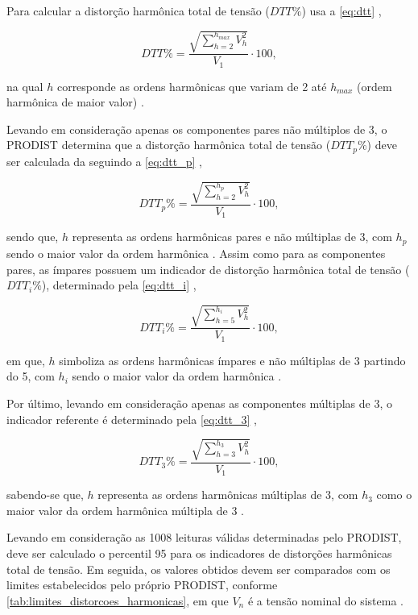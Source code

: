 Para calcular a distorção harmônica total de tensão ($DTT\%$) usa a \autoref{eq:dtt} \cite{ref:ANEEL2021},

\begin{equation}
  DTT\% = \frac{\sqrt{\sum_{h=2}^{h_{max}}V_h^2}}{V_1}\cdot 100,
  \label{eq:dtt}
\end{equation}

\noindent
na qual $h$ corresponde as ordens harmônicas que variam de 2 até $h_{max}$ (ordem harmônica de maior valor) \cite{ref:ANEEL2021}.

Levando em consideração apenas os componentes pares não múltiplos de 3, o PRODIST determina que a distorção harmônica total de tensão ($DTT_p\%$) deve ser calculada da seguindo a \autoref{eq:dtt_p} \cite{ref:ANEEL2021},

\begin{equation}
  DTT_p\% = \frac{\sqrt{\sum_{h=2}^{h_{p}}V_h^2}}{V_1}\cdot 100,
  \label{eq:dtt_p}
\end{equation}

\noindent
sendo que, $h$ representa as ordens harmônicas pares e não múltiplas de 3, com $h_p$ sendo o maior valor da ordem harmônica \cite{ref:ANEEL2021}. Assim como para as componentes pares, as ímpares possuem um indicador de distorção harmônica total de tensão ($DTT_i\%$), determinado pela \autoref{eq:dtt_i} \cite{ref:ANEEL2021},

\begin{equation}
  DTT_i\% = \frac{\sqrt{\sum_{h=5}^{h_{i}}V_h^2}}{V_1}\cdot 100,
  \label{eq:dtt_i}
\end{equation}

\noindent
em que, $h$ simboliza as ordens harmônicas ímpares e não múltiplas de 3 partindo do 5, com $h_i$ sendo o maior valor da ordem harmônica \cite{ref:ANEEL2021}.

Por último, levando em consideração apenas as componentes múltiplas de 3, o indicador referente é determinado pela \autoref{eq:dtt_3} \cite{ref:ANEEL2021},

\begin{equation}
  DTT_3\% = \frac{\sqrt{\sum_{h=3}^{h_{3}}V_h^2}}{V_1}\cdot 100,
  \label{eq:dtt_3}
\end{equation}

\noindent
sabendo-se que, $h$ representa as ordens harmônicas múltiplas de 3, com $h_3$ como o maior valor da ordem harmônica múltipla de 3 \cite{ref:ANEEL2021}.

Levando em consideração as 1008 leituras válidas determinadas pelo PRODIST, deve ser calculado o percentil 95 para os indicadores de distorções harmônicas total de tensão. Em seguida, os valores obtidos devem ser comparados com os limites estabelecidos pelo próprio PRODIST, conforme \autoref{tab:limites_distorcoes_harmonicas}, em que $V_n$ é a tensão nominal do sistema \cite{ref:ANEEL2021}.

